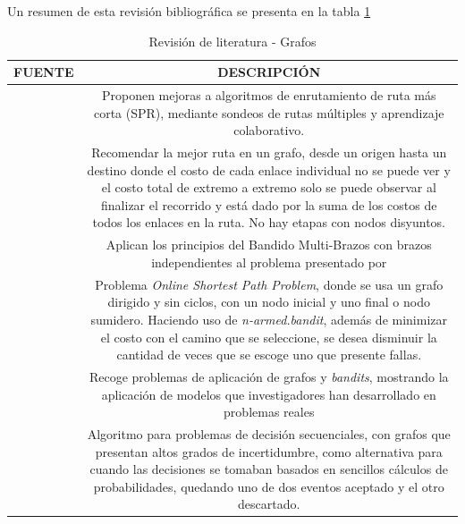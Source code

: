Un resumen de esta revisión bibliográfica se presenta en la tabla \ref{tab:litera1}
\begin{table}[h] 
\caption{Revisión de literatura - Grafos}
\centering
\begin{tabular}{cc}
\textbf{FUENTE}   & \textbf{DESCRIPCIÓN}   \\ \hline
\multicolumn{1}{|l|}{\citet{zhou2019toward}} & \multicolumn{1}{p{10cm}|}{Proponen mejoras a algoritmos de enrutamiento de ruta más corta (SPR), mediante sondeos de rutas múltiples y aprendizaje colaborativo.} \\ \hline
\multicolumn{1}{|l|}{\citet{liu2011multi}}   & \multicolumn{1}{p{10cm}|}{Recomendar la mejor ruta en un grafo, desde un origen hasta un destino donde el costo de cada enlace individual no se puede ver y el costo total de extremo a extremo solo se puede observar al finalizar el recorrido y está dado por la suma de los costos de todos los enlaces en la ruta. No hay etapas con nodos disyuntos.} \\ \hline
\multicolumn{1}{|l|}{\citet{liu2012adaptive}}   & \multicolumn{1}{p{10cm}|}{Aplican los principios del Bandido Multi-Brazos con brazos independientes al problema presentado por \citet{liu2011multi}} \\ \hline
\multicolumn{1}{|l|}{\citet{AvilaCartes2018}}   & \multicolumn{1}{p{10cm}|}{Problema \textit{Online Shortest Path Problem}, donde se usa un grafo dirigido y sin ciclos, con un nodo inicial y uno final o nodo sumidero. Haciendo uso de \textit{n-armed.bandit}, además de minimizar el costo con el camino que se seleccione, se desea disminuir la cantidad de veces que se escoge uno que presente fallas.} \\ \hline
\multicolumn{1}{|l|}{\citet{valko2016bandits}}   & \multicolumn{1}{p{10cm}|}{Recoge problemas de aplicación de grafos y \textit{bandits}, mostrando la aplicación de modelos que investigadores han desarrollado en problemas reales} \\ \hline
\multicolumn{1}{|l|}{\citet{tossou2017thompson}}   & \multicolumn{1}{p{10cm}|}{Algoritmo para problemas de decisión secuenciales, con grafos que presentan altos grados de incertidumbre, como alternativa para cuando las decisiones se tomaban basados en sencillos cálculos de probabilidades, quedando uno de dos eventos aceptado y el otro descartado.} \\ \hline
\end{tabular}
\label{tab:litera1}
\end{table}


